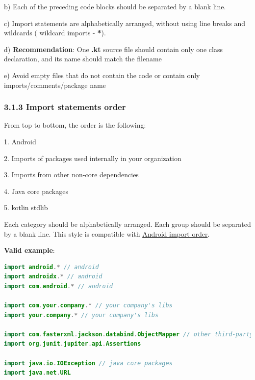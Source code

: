 {{{{{{{{{{{{{{{{b) Each of the preceding code blocks should be separated by a blank line. 



c) Import statements are alphabetically arranged, without using line breaks and wildcards ( wildcard imports - \textbf{*}). 



d) \textbf{Recommendation}: One \textbf{.kt} source file should contain only one class declaration, and its name should match the filename



e) Avoid empty files that do not contain the code or contain only imports/comments/package name



\subsubsection*{\textbf{3.1.3 Import statements order}}
\leavevmode\newline

\label{sec:3.1.3}



From top to bottom, the order is the following:

1. Android

2. Imports of packages used internally in your organization

3. Imports from other non-core dependencies

4. Java core packages

5. kotlin stdlib



Each category should be alphabetically arranged. Each group should be separated by a blank line. This style is compatible with  \href{https://source.android.com/setup/contribute/code-style#order-import-statements}{Android import order}.



\textbf{Valid example}:

\begin{lstlisting}[language=Kotlin]
import android.* // android
import androidx.* // android
import com.android.* // android

import com.your.company.* // your company's libs
import your.company.* // your company's libs

import com.fasterxml.jackson.databind.ObjectMapper // other third-party dependencies
import org.junit.jupiter.api.Assertions

import java.io.IOException // java core packages
import java.net.URL


\end{lstlisting}}}}}}}}}}}}}}}}}
